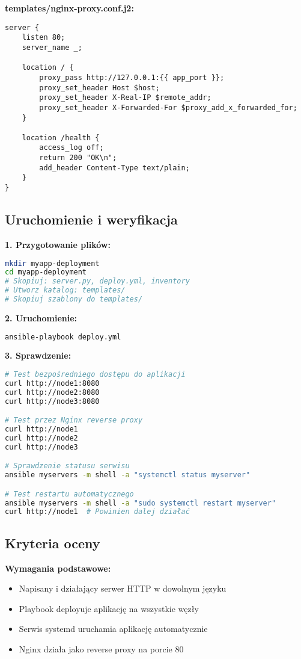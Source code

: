 \documentclass{article}
\begin{document}
\textbf{templates/nginx-proxy.conf.j2:}
\begin{lstlisting}
server {
    listen 80;
    server_name _;
    
    location / {
        proxy_pass http://127.0.0.1:{{ app_port }};
        proxy_set_header Host $host;
        proxy_set_header X-Real-IP $remote_addr;
        proxy_set_header X-Forwarded-For $proxy_add_x_forwarded_for;
    }
    
    location /health {
        access_log off;
        return 200 "OK\n";
        add_header Content-Type text/plain;
    }
}
\end{lstlisting}

\subsection*{Uruchomienie i weryfikacja}

\textbf{1. Przygotowanie plików:}
\begin{lstlisting}[language=bash]
mkdir myapp-deployment
cd myapp-deployment
# Skopiuj: server.py, deploy.yml, inventory
# Utworz katalog: templates/  
# Skopiuj szablony do templates/
\end{lstlisting}

\textbf{2. Uruchomienie:}
\begin{lstlisting}[language=bash]
ansible-playbook deploy.yml
\end{lstlisting}

\textbf{3. Sprawdzenie:}
\begin{lstlisting}[language=bash]
# Test bezpośredniego dostępu do aplikacji
curl http://node1:8080
curl http://node2:8080
curl http://node3:8080

# Test przez Nginx reverse proxy
curl http://node1
curl http://node2
curl http://node3

# Sprawdzenie statusu serwisu
ansible myservers -m shell -a "systemctl status myserver"

# Test restartu automatycznego
ansible myservers -m shell -a "sudo systemctl restart myserver"
curl http://node1  # Powinien dalej działać
\end{lstlisting}

\subsection*{Kryteria oceny}

\textbf{Wymagania podstawowe:}
\begin{itemize}
    \item Napisany i działający serwer HTTP w dowolnym języku
    \item Playbook deployuje aplikację na wszystkie węzły
    \item Serwis systemd uruchamia aplikację automatycznie
    \item Nginx działa jako reverse proxy na porcie 80
\end{itemize}
\end{document}
